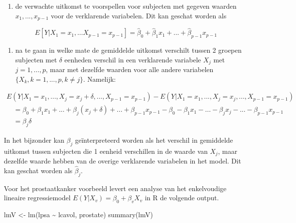 \documentclass[
  dutch,
  letterpaper,
  12pt]{book}
\newenvironment{Shaded}{\begin{snugshade}}{\end{snugshade}}
\newcommand{\FunctionTok}[1]{\textcolor[rgb]{0.28,0.35,0.67}{#1}}
\newcommand{\NormalTok}[1]{\textcolor[rgb]{0.00,0.23,0.31}{#1}}
\newcommand{\OtherTok}[1]{\textcolor[rgb]{0.00,0.23,0.31}{#1}}
\newcommand{\SpecialCharTok}[1]{\textcolor[rgb]{0.37,0.37,0.37}{#1}}
\providecommand{\tightlist}{%
  \setlength{\itemsep}{0pt}\setlength{\parskip}{0pt}}
\theoremstyle{definition}
\theoremstyle{definition}
\theoremstyle{definition}
\theoremstyle{remark}
\begin{document}
\begin{enumerate}
\def\labelenumi{\arabic{enumi}.}
\tightlist
\item
  de verwachte uitkomst te voorspellen voor subjecten met gegeven
  waarden \(x_1,...,x_{p-1}\) voor de verklarende variabelen. Dit kan
  geschat worden als
\end{enumerate}

\[
E[Y\vert X_1=x_1, \ldots X_{p-1}=x_{p-1}]=\hat{\beta}_0+\hat{\beta}_1x_1+...+\hat{\beta}_{p-1}x_{p-1}
\]

\begin{enumerate}
\def\labelenumi{\arabic{enumi}.}
\setcounter{enumi}{1}
\tightlist
\item
  na te gaan in welke mate de gemiddelde uitkomst verschilt tussen 2
  groepen subjecten met \(\delta\) eenheden verschil in een verklarende
  variabele \(X_j\) met \(j=1,\ldots,p\), maar met dezelfde waarden voor
  alle andere variabelen \(\{X_k,k=1,...,p,k\ne j\}\). Namelijk:
\end{enumerate}

\[
\begin{array}{l}
E(Y|X_1=x_1,...,X_j=x_j+\delta,...,X_{p-1}=x_{p-1}) - E(Y|X_1=x_1,...,X_j=x_j,...,X_{p-1}=x_{p-1}) \\
\quad =\beta_0 + \beta_1 x_1 + ... + \beta_j(x_j+\delta)+...+\beta_{p-1} x_{p-1} - \beta_0 - \beta_1 x_1 - ... - \beta_jx_j-...-\beta_{p-1} x_{p-1} \\
\quad= \beta_j\delta
\end{array}
\]

In het bijzonder kan \(\beta_j\) geïnterpreteerd worden als het verschil
in gemiddelde uitkomst tussen subjecten die 1 eenheid verschillen in de
waarde van \(X_j\), maar dezelfde waarde hebben van de overige
verklarende variabelen in het model. Dit kan geschat worden als
\(\hat{\beta}_j\).

Voor het prostaatkanker voorbeeld levert een analyse van het
enkelvoudige lineaire regressiemodel \(E(Y|X_v)=\beta_0+\beta_v X_v\) in
R de volgende output.

\begin{Shaded}
\begin{Highlighting}[]
\NormalTok{lmV }\OtherTok{\textless{}{-}} \FunctionTok{lm}\NormalTok{(lpsa }\SpecialCharTok{\textasciitilde{}}\NormalTok{ lcavol, prostate)}
\FunctionTok{summary}\NormalTok{(lmV)}
\end{Highlighting}
\end{Shaded}
\end{document}
